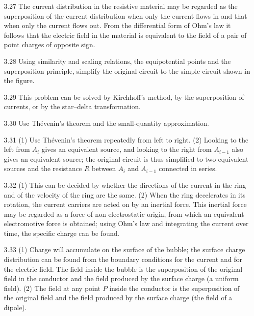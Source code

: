 \begin{hint}{3.27}
The current distribution in the resistive material may be regarded as the superposition of the current distribution when only the current flows in and that when only the current flows out. From the differential form of Ohm's law it follows that the electric field in the material is equivalent to the field of a pair of point charges of opposite sign.
\end{hint}

\begin{hint}{3.28}
Using similarity and scaling relations, the equipotential points and the superposition principle, simplify the original circuit to the simple circuit shown in the figure.
\end{hint}

\begin{hint}{3.29}
This problem can be solved by Kirchhoff's method, by the superposition of currents, or by the star--delta transformation.
\end{hint}

\begin{hint}{3.30}
Use Thévenin's theorem and the small-quantity approximation.
\end{hint}

\begin{hint}{3.31}
(1) Use Thévenin's theorem repeatedly from left to right. (2) Looking to the left from $A_i$ gives an equivalent source, and looking to the right from $A_{i-1}$ also gives an equivalent source; the original circuit is thus simplified to two equivalent sources and the resistance $R$ between $A_i$ and $A_{i-1}$ connected in series.
\end{hint}

\begin{hint}{3.32}
(1) This can be decided by whether the directions of the current in the ring and of the velocity of the ring are the same. (2) When the ring decelerates in its rotation, the current carriers are acted on by an inertial force. This inertial force may be regarded as a force of non-electrostatic origin, from which an equivalent electromotive force is obtained; using Ohm's law and integrating the current over time, the specific charge can be found.
\end{hint}

\begin{hint}{3.33}
(1) Charge will accumulate on the surface of the bubble; the surface charge distribution can be found from the boundary conditions for the current and for the electric field. The field inside the bubble is the superposition of the original field in the conductor and the field produced by the surface charge (a uniform field). (2) The field at any point $P$ inside the conductor is the superposition of the original field and the field produced by the surface charge (the field of a dipole).
\end{hint}

